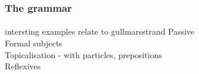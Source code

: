 \documentclass[10pt]{beamer}
\renewcommand{\baselinestretch}{1.5}
\begin{document}
\begin{frame}
\frametitle{The grammar}
\framesubtitle{} 
intersting examples
relate to gullmarsstrand
Passive\\
Formal subjects\\
Topicalisation - with particles, prepositions\\
Reflexives
\end{frame}


%
%
%
\end{document}
